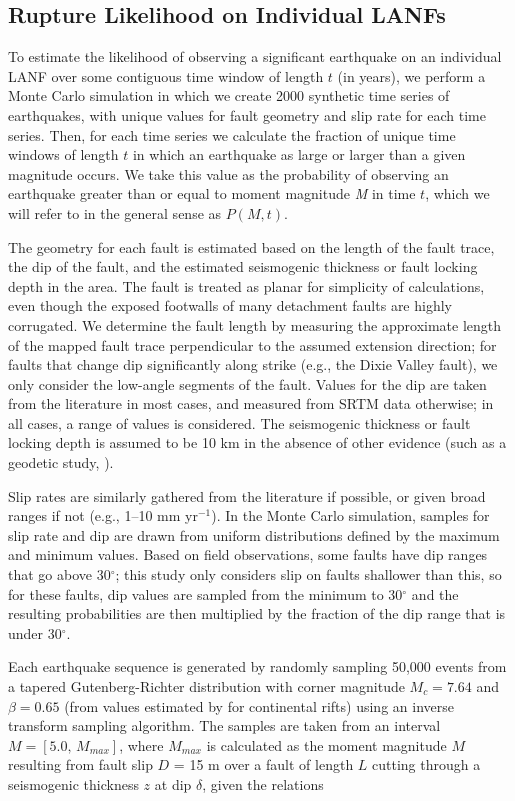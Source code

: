\documentclass[twocolumn,grl]{AGUTeX}
\begin{document}
\begin{article}
\subsection{Rupture Likelihood on Individual LANFs}
To estimate the likelihood of observing a significant earthquake on an individual LANF over some contiguous time window of length $t$ (in years), we perform a Monte Carlo simulation in which we create 2000 synthetic time series of earthquakes, with unique values for fault geometry and slip rate for each time series. Then, for each time series we calculate the fraction of unique time windows of length $t$ in which an earthquake as large or larger than a given magnitude occurs.  We take this value as the probability of observing an earthquake greater than or equal to moment magnitude \emph{M} in time $t$, which we will refer to in the general sense as $P(M,t)$.

The geometry for each fault is estimated based on the length of the fault trace, the dip of the fault, and the estimated seismogenic thickness or fault locking depth in the area.  The fault is treated as planar for simplicity of calculations, even though the exposed footwalls of many detachment faults are highly corrugated.  We determine the fault length by measuring the approximate length of the mapped fault trace perpendicular to the assumed extension direction; for faults that change dip significantly along strike (e.g., the Dixie Valley fault), we only consider the low-angle segments of the fault.  Values for the dip are taken from the literature in most cases, and measured from SRTM data otherwise; in all cases, a range of values is considered.  The seismogenic thickness or fault locking depth is assumed to be 10 km in the absence of other evidence (such as a geodetic study, \citep [e.g.,][]{hreinsdottir2009altotib}).

Slip rates are similarly gathered from the literature if possible, or given broad ranges if not (e.g., 1--10 mm yr$^{-1}$).  In the Monte Carlo simulation, samples for slip rate and dip are drawn from uniform distributions defined by the maximum and minimum values.  Based on field observations, some faults have dip ranges that go above 30$^\circ$; this study only considers slip on faults shallower than this, so for these faults, dip values are sampled from the minimum to 30$^\circ$ and the resulting probabilities are then multiplied by the fraction of the dip range that is under 30$^\circ$.

Each earthquake sequence is generated by randomly sampling 50,000 events from a tapered Gutenberg-Richter distribution with corner magnitude $M_c = 7.64$ and $\beta = 0.65$ (from values estimated by \citet{birdkagan2004f_m} for continental rifts) using an inverse transform sampling algorithm.  The samples are taken from an interval $M = [5.0, \, M_{max}]$, where $M_{max}$ is calculated as the moment magnitude $M$ resulting from fault slip $D$ = 15 m over a fault of length $L$ cutting through a seismogenic thickness $z$ at dip $\delta$, given the relations 


\end{article}
\end{document}
